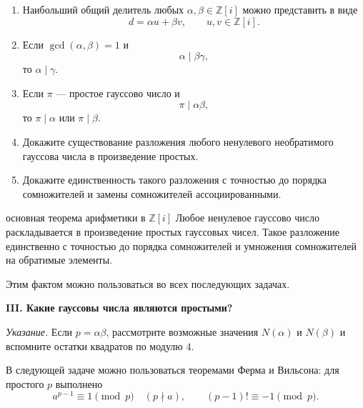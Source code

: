 \begin{enumerate}[label=\textbf{\alph*)}, leftmargin=8mm]
    \item Наибольший общий делитель любых $\alpha,\beta\in\mathbb Z[i]$
    можно представить в виде
    \[
        d=\alpha u+\beta v,
        \qquad u,v\in\mathbb Z[i].
    \]

    \item Если $\gcd(\alpha,\beta)=1$ и
    \[
        \alpha\mid\beta\gamma,
    \]
    то $\alpha\mid\gamma$.

    \item Если $\pi$ — простое гауссово число и
    \[
        \pi\mid\alpha\beta,
    \]
    то $\pi\mid\alpha$ или $\pi\mid\beta$.

    \item Докажите существование разложения любого ненулевого
    необратимого гауссова числа в произведение простых.

    \item Докажите единственность такого разложения с точностью до
    порядка сомножителей и замены сомножителей ассоциированными.
\end{enumerate}

\begin{factbox}{основная теорема арифметики в $\mathbb Z[i]$}
Любое ненулевое гауссово число раскладывается в произведение простых
гауссовых чисел. Такое разложение единственно с точностью до порядка
сомножителей и умножения сомножителей на обратимые элементы.

Этим фактом можно пользоваться во всех последующих задачах.
\end{factbox}

\begin{center}
    {\large\bfseries III. Какие гауссовы числа являются простыми?}
\end{center}


\medskip


\textit{Указание.} Если $p=\alpha\beta$, рассмотрите возможные значения
$N(\alpha)$ и $N(\beta)$ и вспомните остатки квадратов по модулю $4$.

\medskip

\begin{remarkbox}
В следующей задаче можно пользоваться теоремами Ферма и Вильсона:
для простого $p$ выполнено
\[
    a^{p-1}\equiv1\pmod p\quad (p\nmid a),
    \qquad
    (p-1)!\equiv-1\pmod p.
\]
\end{remarkbox}

